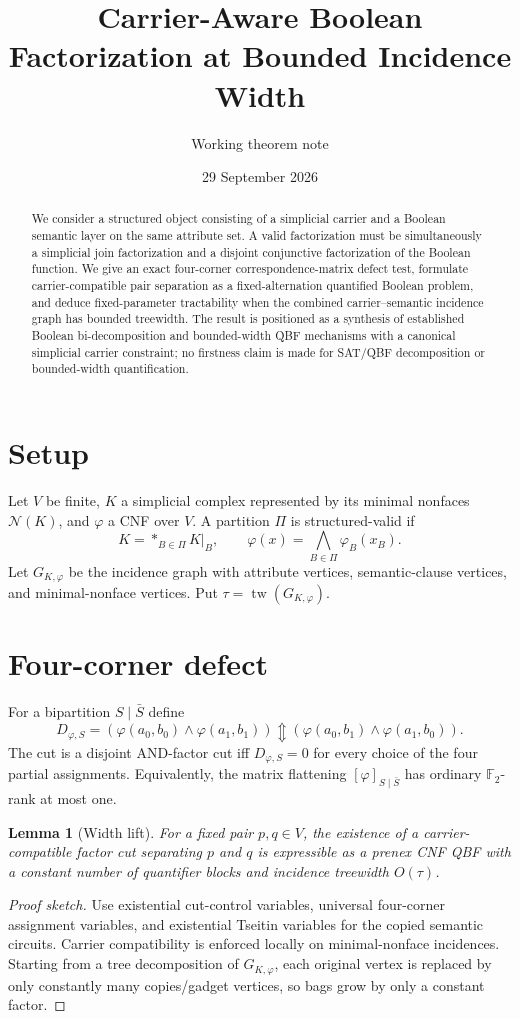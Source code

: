 \documentclass[11pt]{article}
\title{Carrier-Aware Boolean Factorization at Bounded Incidence Width}
\author{Working theorem note}
\date{29 September 2026}
\newtheorem{lemma}{Lemma}
\newcommand{\F}{\mathbb F}
\newcommand{\xor}{\mathbin{\Updownarrow}}
\begin{document}
\maketitle
\begin{abstract}
We consider a structured object consisting of a simplicial carrier and a Boolean semantic layer on the same attribute set. A valid factorization must be simultaneously a simplicial join factorization and a disjoint conjunctive factorization of the Boolean function. We give an exact four-corner correspondence-matrix defect test, formulate carrier-compatible pair separation as a fixed-alternation quantified Boolean problem, and deduce fixed-parameter tractability when the combined carrier--semantic incidence graph has bounded treewidth. The result is positioned as a synthesis of established Boolean bi-decomposition and bounded-width QBF mechanisms with a canonical simplicial carrier constraint; no firstness claim is made for SAT/QBF decomposition or bounded-width quantification.
\end{abstract}

\section{Setup}
Let $V$ be finite, $K$ a simplicial complex represented by its minimal nonfaces $\mathcal N(K)$, and $\varphi$ a CNF over $V$. A partition $\Pi$ is structured-valid if
\[
K=*_{B\in\Pi}K|_B,
\qquad
\varphi(x)=\bigwedge_{B\in\Pi}\varphi_B(x_B).
\]
Let $G_{K,\varphi}$ be the incidence graph with attribute vertices, semantic-clause vertices, and minimal-nonface vertices. Put $\tau=\operatorname{tw}(G_{K,\varphi})$.

\section{Four-corner defect}
For a bipartition $S\mid \bar S$ define
\[
D_{\varphi,S}=
(\varphi(a_0,b_0)\wedge\varphi(a_1,b_1))
\xor
(\varphi(a_0,b_1)\wedge\varphi(a_1,b_0)).
\]
The cut is a disjoint AND-factor cut iff $D_{\varphi,S}=0$ for every choice of the four partial assignments. Equivalently, the matrix flattening $[\varphi]_{S\mid\bar S}$ has ordinary $\F_2$-rank at most one.

\begin{lemma}[Width lift]
For a fixed pair $p,q\in V$, the existence of a carrier-compatible factor cut separating $p$ and $q$ is expressible as a prenex CNF QBF with a constant number of quantifier blocks and incidence treewidth $O(\tau)$.
\end{lemma}
\begin{proof}[Proof sketch]
Use existential cut-control variables, universal four-corner assignment variables, and existential Tseitin variables for the copied semantic circuits. Carrier compatibility is enforced locally on minimal-nonface incidences. Starting from a tree decomposition of $G_{K,\varphi}$, each original vertex is replaced by only constantly many copies/gadget vertices, so bags grow by only a constant factor.
\end{proof}
\end{document}
